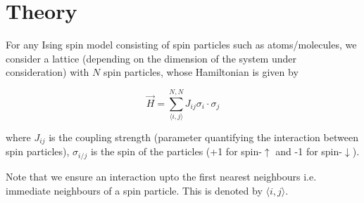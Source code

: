 \section{Theory}
\label{sec:theory} 

For any Ising spin model consisting of spin particles such as atoms/molecules, we consider a lattice (depending on the dimension of the system under consideration) with \( N \) spin particles, whose Hamiltonian is given by

\begin{equation}
    \vec{H} = \sum_{\langle i, j \rangle}^{N, N} J_{ij} \sigma_i \cdot \sigma_j
\end{equation}

where \( J_{ij} \) is the coupling strength (parameter quantifying the interaction between spin particles), \( \sigma_{i/j} \) is the spin of the particles (+1 for spin-\( \uparrow \) and -1 for spin-\( \downarrow \)).

Note that we ensure an interaction upto the first nearest neighbours i.e. immediate neighbours of a spin particle.
This is denoted by \( \langle i, j \rangle \).
